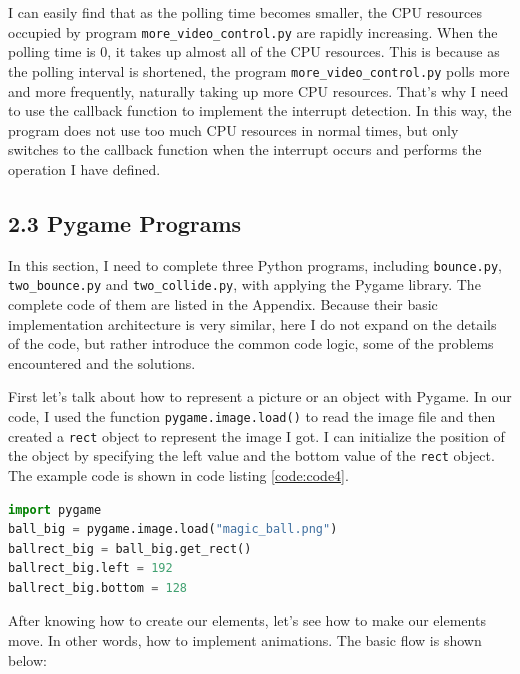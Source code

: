 \documentclass[12pt]{report}
\newcommand{\code}[1]{\colorbox{light-gray}{\texttt{#1}}}
\begin{document}
I can easily find that as the polling time becomes smaller, the CPU resources occupied by program  \code{more\_video\_control.py} are rapidly increasing. When the polling time is 0, it takes up almost all of the CPU resources. This is because as the polling interval is shortened, the program \code{more\_video\_control.py} polls more and more frequently, naturally taking up more CPU resources. That's why I need to use the callback function to implement the interrupt detection. In this way, the program does not use too much CPU resources in normal times, but only switches to the callback function when the interrupt occurs and performs the operation I have defined.\vspace{-1em}

\subsection*{2.3 Pygame Programs}\vspace{-1em}
In this section, I need to complete three Python programs, including \code{bounce.py}, \code{two\_bounce.py} and \code{two\_collide.py}, with applying the Pygame library. The complete code of them are listed in the Appendix. Because their basic implementation architecture is very similar, here I do not expand on the details of the code, but rather introduce the common code logic, some of the problems encountered and the solutions. \par
First let's talk about how to represent a picture or an object with Pygame. In our code, I used the function \code{pygame.image.load()} to read the image file and then created a \code{rect} object to represent the image I got. I can initialize the position of the object by specifying the left value and the bottom value of the \code{rect} object. The example code is shown in code listing \ref{code:code4}. 
\begin{center}
\begin{lstlisting}[language=Python, caption=The example code for representing image with Pygame , label=code:code4]
import pygame 
ball_big = pygame.image.load("magic_ball.png")
ballrect_big = ball_big.get_rect()
ballrect_big.left = 192
ballrect_big.bottom = 128
\end{lstlisting}
\end{center}\vspace{-2em}
After knowing how to create our elements, let's see how to make our elements move. In other words, how to implement animations. The basic flow is shown below:\vspace{-1em}
\end{document}
